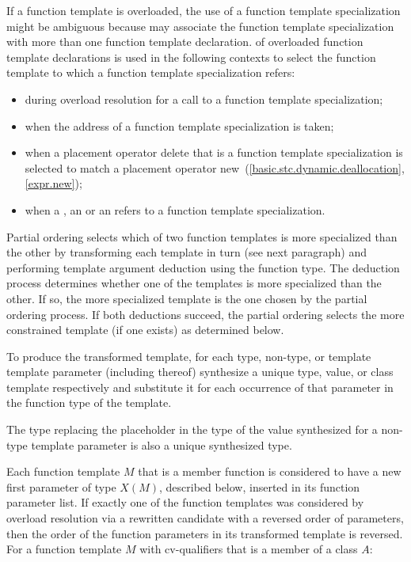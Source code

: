 \pnum
{}%
%
If a function template is overloaded,
the use of a function template specialization might be ambiguous because
 may associate the function
template specialization with more than one function template declaration.
of overloaded function template declarations is used in the following contexts
to select the function template to which a function template specialization
refers:
\begin{itemize}
\item
during overload resolution for a call to a function template specialization;
\item
when the address of a function template specialization is taken;
\item
when a placement operator delete that is a
function template
specialization
is selected to match a placement operator new~(\ref{basic.stc.dynamic.deallocation}, \ref{expr.new});
\item
when a , an
 or an  refers to
a function template specialization.
\end{itemize}

\pnum
Partial ordering selects which of two function templates is more
specialized than the other by transforming each template in turn
(see next paragraph) and performing template argument deduction
using the function type.
The deduction process determines whether
one of the templates is more specialized than the other. If so, the
more specialized template is the one chosen by the partial ordering
process.
If both deductions succeed, the partial ordering selects
the more constrained template (if one exists) as determined below.

\pnum
To produce the transformed template, for each type, non-type, or template
template parameter (including
thereof) synthesize a unique type, value, or class template
respectively and substitute it for each occurrence of that parameter
in the function type of the template.
\begin{note}
The type replacing the placeholder
in the type of the value synthesized for a non-type template parameter
is also a unique synthesized type.
\end{note}
Each function template $M$ that is a member function
is considered to have
a new first parameter of type $X(M)$, described below,
inserted in its function parameter list.
If exactly one of the function templates was considered by overload resolution
via a rewritten candidate
with a reversed order of parameters,
then the order of the function parameters in its transformed template
is reversed.
For a function template $M$ with cv-qualifiers \cv{}
that is a member of a class $A$:

